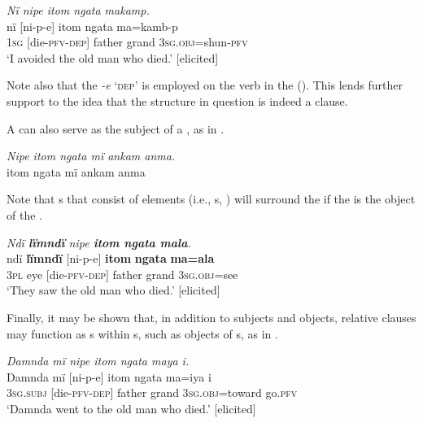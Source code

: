 \ea%
    \label{ex:complex:82}
          \textit{Nï nipe itom ngata makamp.}\\
\gll    nï    [ni-p-e]    itom  ngata  ma=kamb-p\\
    1\textsc{sg}  [die-\textsc{pfv-dep]}  father  grand  3\textsc{sg.obj}=shun-\textsc{pfv}\\
\glt `I avoided the old man who died.’ [elicited]
\z

Note also that the  \textit{-e} ‘\textsc{dep}’ is employed on the verb in the   (). This lends further support to the idea that the structure in question is indeed a clause.

  A  can also serve as the subject of a , as in .

\ea%
    \label{ex:complex:83}
          \textit{Nipe itom ngata mï ankam anma.}\\
\gll    [ni-p-e]    itom  ngata  mï      ankam  anma\\
    [die-\textsc{pfv}{}-\textsc{dep]}  father  grand  \textsc{3sg.subj}  person  good\\
\glt `The old man who died is a good person.’ [elicited]
\z

Note that s that consist of  elements (i.e., s, ) will surround the  if the  is the object of the  .

\ea%
    \label{ex:complex:84}
          \textit{Ndï \textbf{lïmndï} nipe \textbf{itom ngata mala}.}\\
\gll ndï  \textbf{lïmndï}  [ni-p-e]    \textbf{itom}  \textbf{ngata}  \textbf{ma=ala}\\
    3\textsc{pl}  eye    [die{}-\textsc{pfv-dep]}  father  grand  3\textsc{sg.obj}=see\\
\glt `They saw the old man who died.’ [elicited]
\z

Finally, it may be shown that, in addition to subjects and objects, relative clauses may function as s within s, such as objects of s, as in .

 \ea\label{ex:complex:85}  \textit{Damnda mï nipe itom ngata maya i.}\\
\gll    Damnda  mï      [ni-p-e]    itom  ngata  ma=iya i\\
    [name]    3\textsc{sg.subj}  [die-\textsc{pfv-dep]}  father  grand  3\textsc{sg.obj}=toward    go.\textsc{pfv}\\
\glt `Damnda went to the old man who died.’ [elicited]
\z

